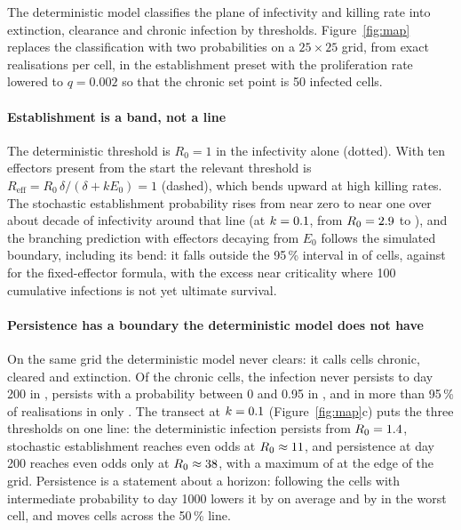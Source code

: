 The deterministic model classifies the plane of infectivity and killing rate into extinction, clearance and chronic infection by thresholds. Figure~\ref{fig:map} replaces the classification with two probabilities on a $25 \times 25$ grid, from \MapN{} exact realisations per cell, in the establishment preset with the proliferation rate lowered to $q = 0.002$ so that the chronic set point is 50 infected cells.

\paragraph{Establishment is a band, not a line}
The deterministic threshold is $R_0 = 1$ in the infectivity alone (dotted). With ten effectors present from the start the relevant threshold is $R_{\mathrm{eff}} = R_0\,\delta/(\delta + kE_0) = 1$ (dashed), which bends upward at high killing rates. The stochastic establishment probability rises from near zero to near one over about \MapTransitionDecades{} decade of infectivity around that line (at $k = 0.1$, from $R_0 = 2.9$ to \MapTransitionRzeroMax), and the branching prediction with effectors decaying from $E_0$ follows the simulated boundary, including its bend: it falls outside the 95\,\% interval in \MapTheoryOutside{} of \MapCells{} cells, against \MapTheoryFixedOutside{} for the fixed-effector formula, with the excess near criticality where 100 cumulative infections is not yet ultimate survival.

\paragraph{Persistence has a boundary the deterministic model does not have}
On the same grid the deterministic model never clears: it calls \MapChronicCells{} cells chronic, \MapClearedCells{} cleared and \MapExtinctionCells{} extinction. Of the \MapChronicCells{} chronic cells, the infection never persists to day 200 in \MapNeverPersist, persists with a probability between 0 and 0.95 in \MapIntermediate, and in more than 95\,\% of realisations in only \MapAlwaysPersist. The transect at $k = 0.1$ (Figure~\ref{fig:map}c) puts the three thresholds on one line: the deterministic infection persists from $R_0 = 1.4$, stochastic establishment reaches even odds at $R_0 \approx 11$, and persistence at day 200 reaches even odds only at $R_0 \approx 38$, with a maximum of \MapPersistMax{} at the edge of the grid. Persistence is a statement about a horizon: following the \MapHorizonCells{} cells with intermediate probability to day 1000 lowers it by \MapHorizonMeanDrop{} on average and by \MapHorizonWorstDrop{} in the worst cell, and moves \MapHorizonFlips{} cells across the 50\,\% line.

